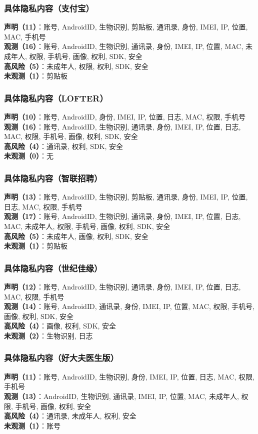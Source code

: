 \documentclass[AutoFakeBold,AutoFakeSlant]{beamer}
\newcommand{\apppiidetail}[4]{%
    \scriptsize
    \textbf{声明（#1）}：#2\\[0.15em]
    \textbf{观测（#3）}：#4\\[0.15em]
}
\begin{document}
\begin{frame}
    \frametitle{具体隐私内容（支付宝）}
    \apppiidetail{11}{账号, AndroidID, 生物识别, 剪贴板, 通讯录, 身份, IMEI, IP, 位置, MAC, 手机号}{16}{账号, AndroidID, 生物识别, 通讯录, 身份, IMEI, IP, 位置, MAC, 未成年人, 权限, 手机号, 画像, 权利, SDK, 安全}
    \textbf{高风险（5）}：未成年人, 权限, 权利, SDK, 安全\\
    \textbf{未观测（1）}：剪贴板
\end{frame}

\begin{frame}
    \frametitle{具体隐私内容（LOFTER）}
    \apppiidetail{10}{账号, AndroidID, 身份, IMEI, IP, 位置, 日志, MAC, 权限, 手机号}{16}{账号, AndroidID, 生物识别, 通讯录, 身份, IMEI, IP, 位置, 日志, MAC, 权限, 手机号, 画像, 权利, SDK, 安全}
    \textbf{高风险（4）}：通讯录, 权利, SDK, 安全\\
    \textbf{未观测（0）}：无
\end{frame}

\begin{frame}
    \frametitle{具体隐私内容（智联招聘）}
    \apppiidetail{13}{账号, AndroidID, 生物识别, 剪贴板, 通讯录, 身份, IMEI, IP, 位置, 日志, MAC, 权限, 手机号}{17}{账号, AndroidID, 生物识别, 通讯录, 身份, IMEI, IP, 位置, 日志, MAC, 未成年人, 权限, 手机号, 画像, 权利, SDK, 安全}
    \textbf{高风险（5）}：未成年人, 画像, 权利, SDK, 安全\\
    \textbf{未观测（1）}：剪贴板
\end{frame}

\begin{frame}
    \frametitle{具体隐私内容（世纪佳缘）}
    \apppiidetail{12}{账号, AndroidID, 生物识别, 通讯录, 身份, IMEI, IP, 位置, 日志, MAC, 权限, 手机号}{14}{账号, AndroidID, 通讯录, 身份, IMEI, IP, 位置, MAC, 权限, 手机号, 画像, 权利, SDK, 安全}
    \textbf{高风险（4）}：画像, 权利, SDK, 安全\\
    \textbf{未观测（2）}：生物识别, 日志
\end{frame}

\begin{frame}
    \frametitle{具体隐私内容（好大夫医生版）}
    \apppiidetail{11}{账号, AndroidID, 生物识别, 身份, IMEI, IP, 位置, 日志, MAC, 权限, 手机号}{13}{AndroidID, 生物识别, 通讯录, IMEI, IP, 位置, MAC, 未成年人, 权限, 手机号, 画像, 权利, 安全}
    \textbf{高风险（4）}：通讯录, 未成年人, 权利, 安全\\
    \textbf{未观测（1）}：账号
\end{frame}
\end{document}

